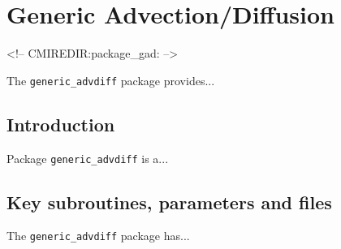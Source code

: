 

\section{Generic Advection/Diffusion}
\label{sec:pkg:gad}
\begin{rawhtml}
<!-- CMIREDIR:package_gad: -->
\end{rawhtml}

The {\tt generic\_advdiff} package provides...


\subsection{Introduction}
Package {\tt generic\_advdiff} is a...


\subsection{Key subroutines, parameters and files}
\label{sec:pkg:rw:implementation_synopsis}
The {\tt generic\_advdiff} package has... 


